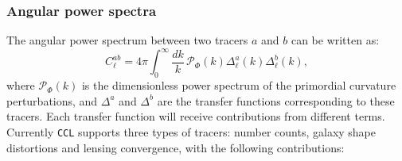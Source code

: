 \documentclass[\docopts]{\docclass}
\newcommand{\ccl}{{\tt CCL}\xspace}
\begin{document}
\subsubsection{Angular power spectra}\label{sssec:2pt.pspec}

The angular power spectrum between two tracers $a$ and $b$ can be written as:
\begin{equation}
  C^{ab}_\ell=4\pi\int_0^\infty \frac{dk}{k}\,\mathcal{P}_\Phi(k)\Delta^a_\ell(k)\Delta^b_\ell(k),
\end{equation}
where $\mathcal{P}_\Phi(k)$ is the dimensionless power spectrum of the primordial curvature perturbations, and $\Delta^a$ and $\Delta^b$ are the transfer functions corresponding to these tracers. Each transfer function will receive contributions from different terms. Currently \ccl supports three types of tracers: number counts, galaxy shape distortions and lensing convergence, with the following contributions:
\end{document}
